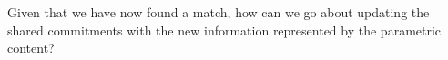 Given that we have now found a match, how can we go about updating the
shared commitments with the new information represented by the
parametric content?  %
 
 
 

